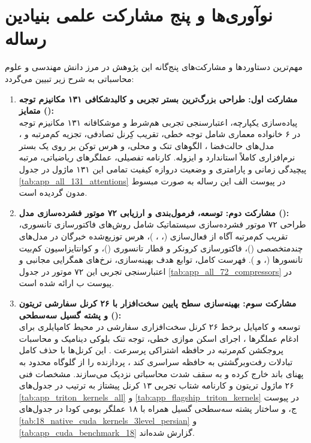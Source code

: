 \documentclass[12pt,a4paper]{report}
\theoremstyle{definition}
\begin{document}
\section{نوآوری‌ها و پنج مشارکت علمی بنیادین رساله}
\label{sec:core_contributions}
مهم‌ترین دستاوردها و مشارکت‌های پنج‌گانه این پژوهش در مرز دانش مهندسی و علوم محاسباتی به شرح زیر تبیین می‌گردد:

\begin{enumerate}
    \item \textbf{مشارکت اول: طراحی بزرگ‌ترین بستر تجربی و کالبدشکافی ۱۳۱ مکانیزم توجه متمایز ():} \\
    پیاده‌سازی یکپارچه، اعتبارسنجی تجربی هم‌شرط و موشکافانه ۱۳۱ مکانیزم توجه در ۶ خانواده معماری شامل توجه خطی، تقریب کِرنل تصادفی، تجزیه کم‌مرتبه و ، مدل‌های حالت‌فضا ، الگوهای تنک و محلی، و هرس توکن بر روی یک بستر نرم‌افزاری کاملاً استاندارد و ایزوله. کارنامه تفصیلی، عملگرهای ریاضیاتی، مرتبه پیچیدگی زمانی و پارامتری و وضعیت دروازه کیفیت تمامی این ۱۳۱ ماژول در جدول \ref{tab:app_all_131_attentions} در پیوست الف این رساله به صورت مبسوط مدون گردیده است.

    \item \textbf{مشارکت دوم: توسعه، فرمول‌بندی و ارزیابی ۷۲ موتور فشرده‌سازی مدل ():} \\
    طراحی ۷۲ موتور فشرده‌سازی سیستماتیک شامل روش‌های فاکتورسازی تانسوری، تقریب کم‌مرتبه آگاه از فعال‌سازی (، ، )، هرس توزیع‌شده خبرگان در مدل‌های چندمتخصصی ()، فاکتورسازی کرونکر و قطار تانسوری ()، و کوانتایزاسیون کم‌بیت تانسورها (،  و ). فهرست کامل، توابع هدف بهینه‌سازی، نرخ‌های همگرایی مجانبی و اعتبارسنجی تجربی این ۷۲ موتور در جدول \ref{tab:app_all_72_compressors} در پیوست ب ارائه شده است.

    \item \textbf{مشارکت سوم: بهینه‌سازی سطح پایین سخت‌افزار با ۲۶ کرنل سفارشی تریتون () و پشته گسیل سه‌سطحی:} \\
    توسعه و کامپایل برخط ۲۶ کرنل سخت‌افزاری سفارشی در محیط کامپایلری  برای ادغام عملگرها ، اجرای اسکن موازی خطی، توجه تنک بلوکی دینامیک  و محاسبات پروجکشن کم‌مرتبه در حافظه اشتراکی پرسرعت . این کرنل‌ها با حذف کامل تبادلات رفت‌وبرگشتی به حافظه سراسری کند ، پردازنده را از گلوگاه محدود به پهنای باند خارج کرده و به سقف شدت محاسباتی نزدیک می‌سازند. مشخصات فنی ۲۶ ماژول تریتون و کارنامه شتاب تجربی ۱۳ کرنل پیشتاز به ترتیب در جدول‌های \ref{tab:app_triton_kernels_all} و \ref{tab:app_flagship_triton_kernels} در پیوست ج، و ساختار پشته سه‌سطحی گسیل همراه با ۱۸ عملگر بومی کودا در جدول‌های \ref{tab:18_native_cuda_kernels_3level_persian} و \ref{tab:app_cuda_benchmark_18} گزارش شده‌اند.


\end{enumerate}
\end{document}
